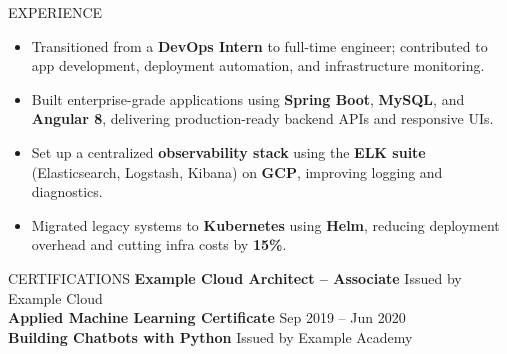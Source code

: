 \documentclass{resume} %
\begin{document}
\begin{rSection}{EXPERIENCE}
\begin{itemize}
\itemsep -3pt {}
    \item Transitioned from a \textbf{DevOps Intern} to full-time engineer; contributed to app development, deployment automation, and infrastructure monitoring.
    \item Built enterprise-grade applications using \textbf{Spring Boot}, \textbf{MySQL}, and \textbf{Angular 8}, delivering production-ready backend APIs and responsive UIs.
    \item Set up a centralized \textbf{observability stack} using the \textbf{ELK suite} (Elasticsearch, Logstash, Kibana) on \textbf{GCP}, improving logging and diagnostics.
    \item Migrated legacy systems to \textbf{Kubernetes} using \textbf{Helm}, reducing deployment overhead and cutting infra costs by \textbf{15\%}.
\end{itemize}



\end{rSection}



\vspace{-0.2em}
\begin{rSection}{CERTIFICATIONS}
\textbf{Example Cloud Architect – Associate} \hfill Issued by Example Cloud \\
\textbf{Applied Machine Learning Certificate} \hfill Sep 2019 – Jun 2020 \\
\textbf{Building Chatbots with Python} \hfill Issued by Example Academy \\

\end{rSection}





\end{document}
